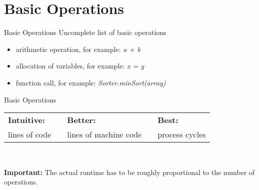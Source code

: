 \section{Basic Operations}

\begin{frame}{Basic Operations}
  Uncomplete list of basic operations
  \begin{center}
    \begin{itemize}
      \item
        arithmetic operation, for example: \textit{a + b}
      \item
        allocation of variables, for example: \textit{x = y}
      \item
        function call, for example: \textit{Sorter.minSort(array)}
    \end{itemize}
  \end{center}
\end{frame}


\begin{frame}{Basic Operations}
  \begin{tabularx}{\textwidth}{@{}XcXcX@{}}
    \cellcolor{Mittel-Blau} {\color{white}\textbf{Intuitive:}} &
    {} &
    \cellcolor{Mittel-Blau} {\color{white}\textbf{Better:}} &
    {} &
    \cellcolor{Mittel-Blau} {\color{white}\textbf{Best:}}\\[0.5em]
    \rule{0pt}{1.25em}\cellcolor{Hell-Blau}lines of code &
    {} &
    \cellcolor{Hell-Blau}lines of machine code &
    {} &
    \cellcolor{Hell-Blau}process cycles
  \end{tabularx}\\[1.5em]
  \begin{alertblock}{\textbf{Important:}}
    The actual runtime has to be roughly proportional
    to the number of operations.
  \end{alertblock}
\end{frame}